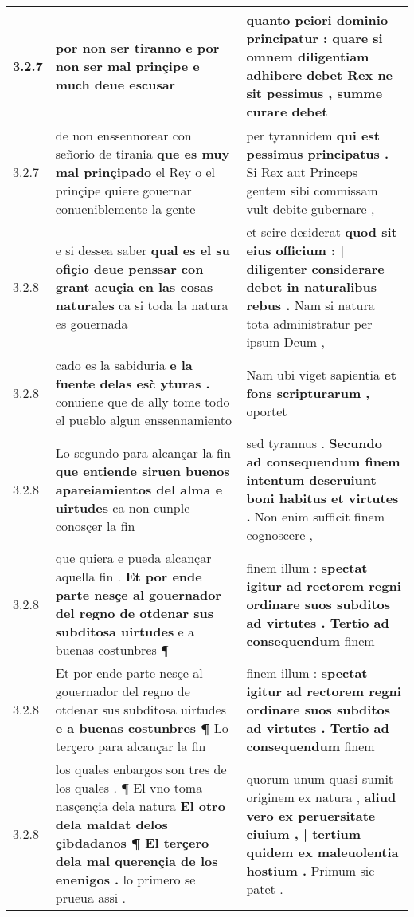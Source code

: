 \begin{tabular}{|p{1cm}|p{6.5cm}|p{6.5cm}|}
3.2.7 & por non ser tiranno \textbf{ e por non ser mal prinçipe } e much deue escusar & quanto peiori dominio principatur : quare si omnem diligentiam adhibere debet Rex \textbf{ ne sit pessimus , } summe curare debet \\\hline
3.2.7 & de non enssennorear con señorio de tirania \textbf{ que es muy mal prinçipado } el Rey o el prinçipe quiere gouernar conueniblemente la gente & per tyrannidem \textbf{ qui est pessimus principatus . } Si Rex aut Princeps gentem sibi commissam vult debite gubernare , \\\hline
3.2.8 & e si dessea saber \textbf{ qual es el su ofiçio deue penssar con grant acuçia en las cosas naturales } ca si toda la natura es gouernada & et scire desiderat \textbf{ quod sit eius officium : | diligenter considerare debet in naturalibus rebus . } Nam si natura tota administratur per ipsum Deum , \\\hline
3.2.8 & cado es la sabiduria \textbf{ e la fuente delas esc̀ yturas . } conuiene que de ally tome todo el pueblo algun enssennamiento & Nam ubi viget sapientia \textbf{ et fons scripturarum , } oportet \\\hline
3.2.8 & Lo segundo para alcançar la fin \textbf{ que entiende siruen buenos apareiamientos del alma e uirtudes } ca non cunple conosçer la fin & sed tyrannus . \textbf{ Secundo ad consequendum finem intentum deseruiunt boni habitus et virtutes . } Non enim sufficit finem cognoscere , \\\hline
3.2.8 & que quiera e pueda alcançar aquella fin . \textbf{ Et por ende parte nesçe al gouernador del regno de otdenar sus subditosa uirtudes } e a buenas costunbres ¶ & finem illum : \textbf{ spectat igitur ad rectorem regni ordinare suos subditos ad virtutes . Tertio ad consequendum } finem \\\hline
3.2.8 & Et por ende parte nesçe al gouernador del regno de otdenar sus subditosa uirtudes \textbf{ e a buenas costunbres ¶ } Lo terçero para alcançar la fin & finem illum : \textbf{ spectat igitur ad rectorem regni ordinare suos subditos ad virtutes . Tertio ad consequendum } finem \\\hline
3.2.8 & los quales enbargos son tres de los quales . ¶ El vno toma nasçençia dela natura \textbf{ El otro dela maldat delos çibdadanos ¶ El terçero dela mal querençia de los enenigos . } lo primero se prueua assi . & quorum unum quasi sumit originem ex natura , \textbf{ aliud vero ex peruersitate ciuium , | tertium quidem ex maleuolentia hostium . } Primum sic patet . \\\hline

\end{tabular}
